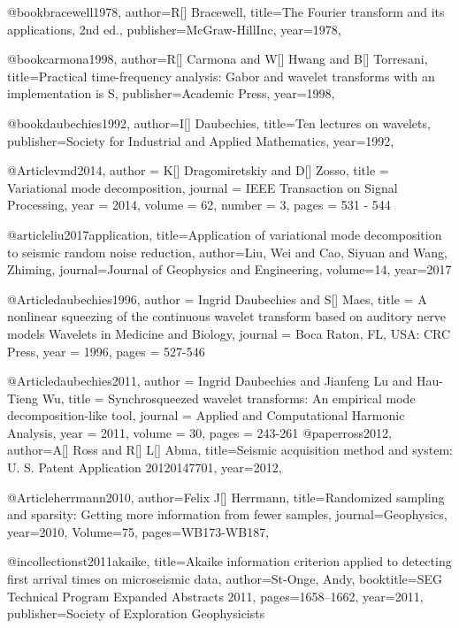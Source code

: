 {@book{bracewell1978,
  author={R[] Bracewell},
  title={The Fourier transform and its applications, 2nd ed.},
  publisher={McGraw-HillInc},
  year=1978,
}

@book{carmona1998,
  author={R[] Carmona and W[] Hwang and B[] Torresani},
  title={Practical time-frequency analysis: Gabor and wavelet transforms with an implementation is S},
  publisher={Academic Press},
  year=1998,
}

@book{daubechies1992,
  author={I[] Daubechies},
  title={Ten lectures on wavelets},
  publisher={Society for Industrial and Applied Mathematics},
  year=1992,
}

@Article{vmd2014,
  author = 	 {K[] Dragomiretskiy and D[] Zosso},
  title = 	 {Variational mode decomposition},
  journal = 	 {IEEE Transaction on Signal Processing},
  year = 	 2014,
  volume = 62,
  number = 3,
  pages = 	 {531 - 544}
}

@article{liu2017application,
  title={Application of variational mode decomposition to seismic random noise reduction},
  author={Liu, Wei and Cao, Siyuan and Wang, Zhiming},
  journal={Journal of Geophysics and Engineering},
  volume={14},
  year={2017}
}

@Article{daubechies1996,
  author = 	 {Ingrid Daubechies and S[] Maes},
  title = 	 {A nonlinear squeezing of the continuous wavelet transform based on auditory nerve models Wavelets in Medicine and Biology},
  journal = 	 {Boca Raton, FL, USA: CRC Press},
  year = 	 1996,
  pages = 	 {527-546}
}

@Article{daubechies2011,
  author = 	 {Ingrid Daubechies and Jianfeng Lu and Hau-Tieng Wu},
  title = 	 {Synchrosqueezed wavelet transforms: An empirical mode decomposition-like tool},
  journal = 	 {Applied and Computational Harmonic Analysis},
  year = 	 2011,
  volume = 	 30,
  pages = 	 {243-261}
}
@paper{ross2012,
  author={A[] Ross and R[] L[] Abma},
  title={Seismic acquisition method and system: U. S. Patent Application
20120147701},
  year=2012,
}

@Article{herrmann2010,
  author={Felix J[] Herrmann},
  title={Randomized sampling and sparsity: Getting more information from fewer samples},
  journal={Geophysics},
  year=2010,
  Volume=75,
  pages={WB173-WB187},
}

@incollection{st2011akaike,
  title={Akaike information criterion applied to detecting first arrival times on microseismic data},
  author={St-Onge, Andy},
  booktitle={SEG Technical Program Expanded Abstracts 2011},
  pages={1658--1662},
  year={2011},
  publisher={Society of Exploration Geophysicists}
}

}

